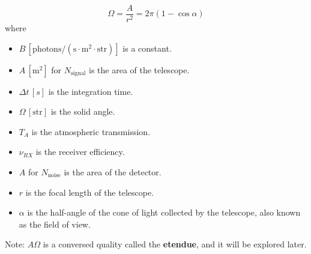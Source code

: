 \begin{itemize}
          \begin{equation*}
              \Omega = \frac{A}{r^2} = 2\pi(1-\cos\alpha)
          \end{equation*}
          where
          \begin{itemize}
              \item $B \, [\text{photons}/(\text{s} \cdot \text{m}^2 \cdot \text{str})]$ is a constant.
              \item $A \, [\text{m}^2]$ for $N_{\text{signal}}$ is the area of the telescope.
              \item $\Delta t \, [s]$ is the integration time.
              \item $\Omega \, [\text{str}]$ is the solid angle.
              \item $T_A$ is the atmospheric transmission.
              \item $\nu_{RX}$ is the receiver efficiency.
              \item $A$ for $N_{\text{noise}}$ is the area of the detector.
              \item $r$ is the focal length of the telescope.
              \item $\alpha$ is the half-angle of the cone of light collected by the telescope, also known as the field of view.
          \end{itemize}
          Note: $A\Omega$ is a conversed quality called the \textbf{etendue}, and it will be explored later.
\end{itemize}